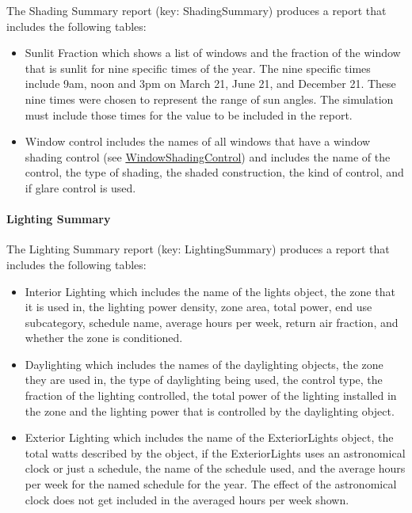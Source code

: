 The Shading Summary report (key: ShadingSummary) produces a report that includes the following tables:

\begin{itemize}
\item
  Sunlit Fraction which shows a list of windows and the fraction of the window that is sunlit for nine specific times of the year. The nine specific times include 9am, noon and 3pm on March 21, June 21, and December 21. These nine times were chosen to represent the range of sun angles. The simulation must include those times for the value to be included in the report.
\item
  Window control includes the names of all windows that have a window shading control (see \hyperref[windowpropertyshadingcontrol]{WindowShadingControl}) and includes the name of the control, the type of shading, the shaded construction, the kind of control, and if glare control is used.
\end{itemize}

\paragraph{Lighting Summary}\label{lighting-summary}

The Lighting Summary report (key: LightingSummary) produces a report that includes the following tables:

\begin{itemize}
\item
  Interior Lighting which includes the name of the lights object, the zone that it is used in, the lighting power density, zone area, total power, end use subcategory, schedule name, average hours per week, return air fraction, and whether the zone is conditioned.
\item
  Daylighting which includes the names of the daylighting objects, the zone they are used in, the type of daylighting being used, the control type, the fraction of the lighting controlled, the total power of the lighting installed in the zone and the lighting power that is controlled by the daylighting object.
\item
  Exterior Lighting which includes the name of the ExteriorLights object, the total watts described by the object, if the ExteriorLights uses an astronomical clock or just a schedule, the name of the schedule used, and the average hours per week for the named schedule for the year. The effect of the astronomical clock does not get included in the averaged hours per week shown.
\end{itemize}

